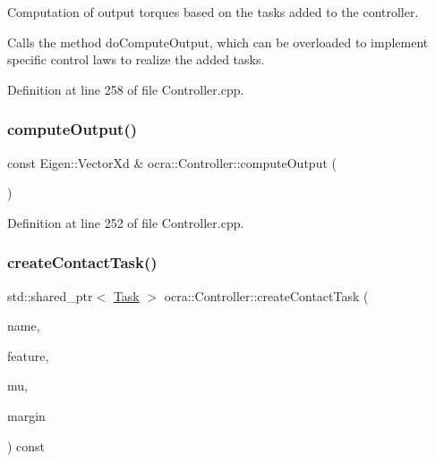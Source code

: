 Computation of output torques based on the tasks added to the controller. 

Calls the method do\+Compute\+Output, which can be overloaded to implement specific control laws to realize the added tasks. 

Definition at line 258 of file Controller.\+cpp.

\hypertarget{classocra_1_1Controller_a5d8c4178b4e9536187e355dc25f3739f}{}\label{classocra_1_1Controller_a5d8c4178b4e9536187e355dc25f3739f} 
\subsubsection{\texorpdfstring{compute\+Output()}{computeOutput()}\hspace{0.1cm}{\footnotesize\ttfamily [2/2]}}
{\footnotesize\ttfamily const Eigen\+::\+Vector\+Xd \& ocra\+::\+Controller\+::compute\+Output (\begin{DoxyParamCaption}{ }\end{DoxyParamCaption})}



Definition at line 252 of file Controller.\+cpp.

\hypertarget{classocra_1_1Controller_af1d9bb73b939a5377a3dba072ce4c08a}{}\label{classocra_1_1Controller_af1d9bb73b939a5377a3dba072ce4c08a} 
\subsubsection{\texorpdfstring{create\+Contact\+Task()}{createContactTask()}}
{\footnotesize\ttfamily std\+::shared\+\_\+ptr$<$ \hyperlink{classocra_1_1Task}{Task} $>$ ocra\+::\+Controller\+::create\+Contact\+Task (\begin{DoxyParamCaption}\item[{const std\+::string \&}]{name,  }\item[{Point\+Contact\+Feature\+::\+Ptr}]{feature,  }\item[{double}]{mu,  }\item[{double}]{margin }\end{DoxyParamCaption}) const}



